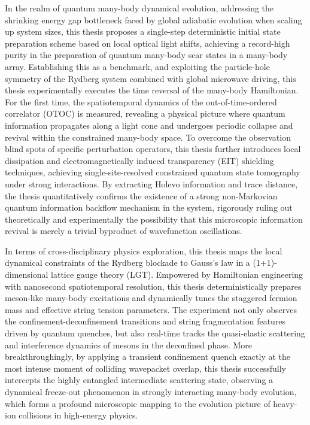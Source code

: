 \documentclass[type=doctor, anonymous=true]{hustthesis}
\begin{document}
\begin{abstract*}
In the realm of quantum many-body dynamical evolution, addressing the shrinking energy gap bottleneck faced by global adiabatic evolution when scaling up system sizes, this thesis proposes a single-step deterministic initial state preparation scheme based on local optical light shifts, achieving a record-high purity in the preparation of quantum many-body scar states in a many-body array. Establishing this as a benchmark, and exploiting the particle-hole symmetry of the Rydberg system combined with global microwave driving, this thesis experimentally executes the time reversal of the many-body Hamiltonian. For the first time, the spatiotemporal dynamics of the out-of-time-ordered correlator (OTOC) is measured, revealing a physical picture where quantum information propagates along a light cone and undergoes periodic collapse and revival within the constrained many-body space. To overcome the observation blind spots of specific perturbation operators, this thesis further introduces local dissipation and electromagnetically induced transparency (EIT) shielding techniques, achieving single-site-resolved constrained quantum state tomography under strong interactions. By extracting Holevo information and trace distance, the thesis quantitatively confirms the existence of a strong non-Markovian quantum information backflow mechanism in the system, rigorously ruling out theoretically and experimentally the possibility that this microscopic information revival is merely a trivial byproduct of wavefunction oscillations.

In terms of cross-disciplinary physics exploration, this thesis maps the local dynamical constraints of the Rydberg blockade to Gauss's law in a (1+1)-dimensional lattice gauge theory (LGT). Empowered by Hamiltonian engineering with nanosecond spatiotemporal resolution, this thesis deterministically prepares meson-like many-body excitations and dynamically tunes the staggered fermion mass and effective string tension parameters. The experiment not only observes the confinement-deconfinement transitions and string fragmentation features driven by quantum quenches, but also real-time tracks the quasi-elastic scattering and interference dynamics of mesons in the deconfined phase. More breakthroughingly, by applying a transient confinement quench exactly at the most intense moment of colliding wavepacket overlap, this thesis successfully intercepts the highly entangled intermediate scattering state, observing a dynamical freeze-out phenomenon in strongly interacting many-body evolution, which forms a profound microscopic mapping to the evolution picture of heavy-ion collisions in high-energy physics.


\end{abstract*}
\end{document}
